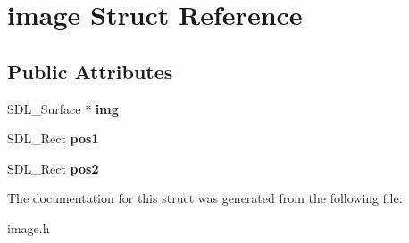 \hypertarget{structimage}{}\section{image Struct Reference}
\label{structimage}
\subsection*{Public Attributes}
\begin{DoxyCompactItemize}
\item 
\mbox{\label{structimage_a27c5d076eb3f7ede915b271bf8b3a695}} 
S\+D\+L\+\_\+\+Surface $\ast$ {\bfseries img}
\item 
\mbox{\label{structimage_aaa942311e7424188aab0194caefca88a}} 
S\+D\+L\+\_\+\+Rect {\bfseries pos1}
\item 
\mbox{\label{structimage_ad68334d67d036a692c7f309ce2670468}} 
S\+D\+L\+\_\+\+Rect {\bfseries pos2}
\end{DoxyCompactItemize}


The documentation for this struct was generated from the following file\+:\begin{DoxyCompactItemize}
\item 
image.\+h\end{DoxyCompactItemize}
